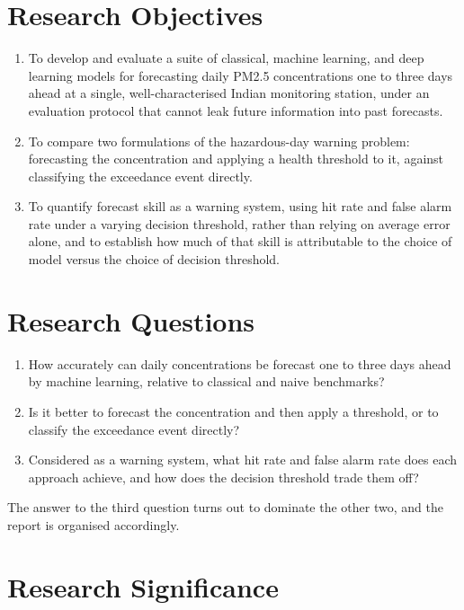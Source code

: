 \documentclass[12pt,a4paper]{report}
\begin{document}
\section{Research Objectives}

\begin{enumerate}
\item To develop and evaluate a suite of classical, machine learning, and
deep learning models for forecasting daily PM2.5 concentrations one to three
days ahead at a single, well-characterised Indian monitoring station, under
an evaluation protocol that cannot leak future information into past
forecasts.
\item To compare two formulations of the hazardous-day warning problem:
forecasting the concentration and applying a health threshold to it, against
classifying the exceedance event directly.
\item To quantify forecast skill as a warning system, using hit rate and
false alarm rate under a varying decision threshold, rather than relying on
average error alone, and to establish how much of that skill is attributable
to the choice of model versus the choice of decision threshold.
\end{enumerate}

\section{Research Questions}

\begin{enumerate}
\item How accurately can daily concentrations be forecast one to three days
ahead by machine learning, relative to classical and naive benchmarks?
\item Is it better to forecast the concentration and then apply a threshold, or
to classify the exceedance event directly?
\item Considered as a warning system, what hit rate and false alarm rate does
each approach achieve, and how does the decision threshold trade them off?
\end{enumerate}

The answer to the third question turns out to dominate the other two, and the
report is organised accordingly.

\section{Research Significance}
\end{document}
